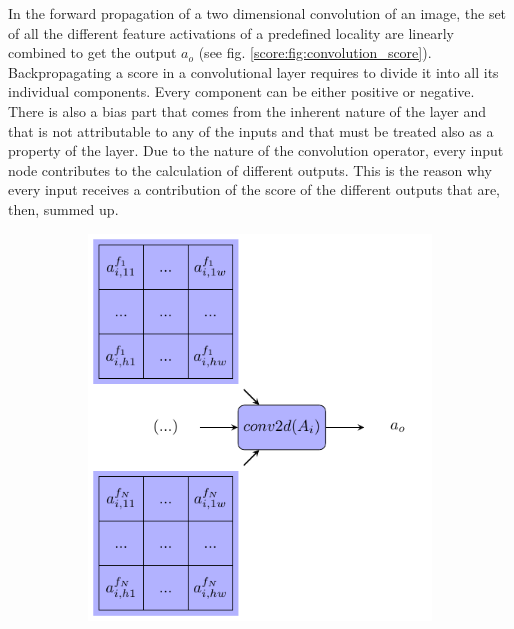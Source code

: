 In the forward propagation of a two dimensional convolution of an image, the set of all the different feature activations of a predefined locality are linearly combined to get the output $a_o$ (see fig. \ref{score:fig:convolution_score}). Backpropagating a score in a convolutional layer requires to divide it into all its individual components. Every component can be either positive or negative. There is also a bias part that comes from the inherent nature of the layer and that is not attributable to any of the inputs and that must be treated also as a property of the layer. Due to the nature of the convolution operator, every input node contributes to the calculation of different outputs. This is the reason why every input receives a contribution of the score of the different outputs that are, then, summed up.

\begin{figure}[!ht]
	\centering
	\begin{subfigure}{0.4\textwidth}
		\includegraphics[scale=0.5]{Figures/chapter_interpretation/figures/score_conv2d.pdf}
	\end{subfigure}
	~ %
	\begin{subfigure}{0.4\textwidth}

\end{subfigure}
\end{figure}

